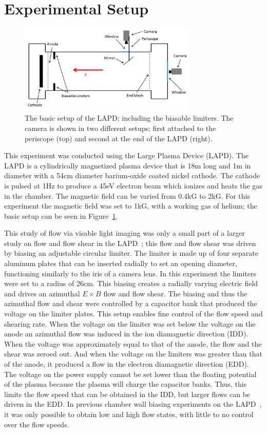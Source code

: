 \documentclass[%
 reprint,
 amsmath,amssymb,
 aps,
]{revtex4-1}
\begin{document}
%
%
%
%
\section{\label{sec:level1}Experimental Setup}

\begin{figure}[!htbp] %
\centerline{}
\includegraphics[width=8.5cm]{plot_of_LAPD}
\caption{\label{fig:plot_of_LAPD}The basic setup of the LAPD; including the biasable limiters. The camera is shown in two different setups; first attached to the periscope (top) and second at the end of the LAPD (right).}
\end{figure}

This experiment was conducted using the Large Plasma Device (LAPD). The LAPD is a cylindrically magnetized plasma device that is 18m long and 1m in diameter with a 54cm diameter barium-oxide coated nickel cathode. The cathode is pulsed at 1Hz to produce a 45eV electron beam which ionizes and heats the gas in the chamber. The magnetic field can be varied from 0.4kG to 2kG. For this experiment the magnetic field was set to 1kG, with a working gas of helium; the basic setup can be seen in Figure~\ref{fig:plot_of_LAPD}.

This study of flow via visable light imaging was only a small part of a larger study on flow and flow shear in the LAPD~\cite{schaffner12, schaffner13}; this flow and flow shear was driven by biasing an adjustable circular limiter. The limiter is made up of four separate aluminum plates that can be inserted radially to set an opening diameter, functioning similarly to the iris of a camera lens. In this experiment the limiters were set to a radius of 26cm. This biasing creates a radially varying electric field and drives an azimuthal $E \times B$ flow and flow shear. The biasing and thus the azimuthal flow and shear were controlled by a capacitor bank that produced the voltage on the limiter plates. This setup enables fine control of the flow speed and shearing rate. When the voltage on the limiter was set below the voltage on the anode an azimuthal flow was induced in the ion diamagnetic direction (IDD). When the voltage was approximately equal to that of the anode, the flow and the shear was zeroed out. And when the voltage on the limiters was greater than that of the anode, it produced a flow in the electron diamagnetic direction (EDD). The voltage on the power supply cannot be set lower than the floating potential of the plasma because the plasma will charge the capacitor banks. Thus, this limits the flow speed that can be obtained in the IDD, but larger flows can be driven in the EDD. In previous chamber wall biasing experiments on the LAPD~\cite{Carter09}, it was only possible to obtain low and high flow states, with little to no control over the flow speeds.
\end{document}
